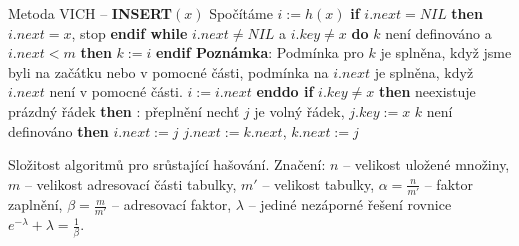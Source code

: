 \documentclass[a4paper,12pt]{article}
\begin{document}
Metoda VICH -- {\bf INSERT$(x)$}\newline 
Spočítáme $i:=h(x)$\newline 
{\bf if} $i.next=NIL$ {\bf then} $i.next=x$, stop {\bf endif\newline 
while} $i.next\ne NIL$ a $i.key\ne x$ {\bf do}\newline 
\phantom{---}{\bf if} $k$ není definováno a $i.next<m$ {\bf then} $k:=i$ {\bf endif\newline 
Poznámka}: Podmínka pro $k$ je splněna, když jsme byli na 
začátku nebo v pomocné části, podmínka na $i.next$ je 
splněna, když $i.next$ není v pomocné části.\newline 
\phantom{---}$i:=i.next$\newline 
{\bf enddo\newline 
if} $i.key\ne x$ {\bf then}\newline 
\phantom{---}{\bf if} neexistuje prázdný řádek {\bf then}\newline 
\phantom{------}{\bf Výstup}: přeplnění\newline 
\phantom{---}{\bf else}\newline 
\phantom{------}nechť $j$ je volný řádek, $j.key:=x$\newline 
\phantom{------}{\bf if} $k$ není definováno {\bf then}\newline 
\phantom{---------}$i.next:=j$\newline 
\phantom{------}{\bf else}\newline 
\phantom{---------}$j.next:=k.next$, $k.next:=j$\newline 
\phantom{------}{\bf endif}\newline 
\phantom{---}{\bf endif\newline 
endif}


Složitost algoritmů pro srůstající hašování.\newline 
Značení: $n$ -- velikost uložené množiny,\newline 
$m$ -- velikost adresovací části tabulky,\newline 
$m'$ -- velikost tabulky,\newline 
$\alpha =\frac n{m'}$ -- faktor zaplnění,\newline 
$\beta =\frac m{m'}$ -- adresovací faktor,\newline 
$\lambda$ -- jediné nezáporné řešení rovnice $e^{
-\lambda}+\lambda =\frac 1{\beta}$.
\end{document}
